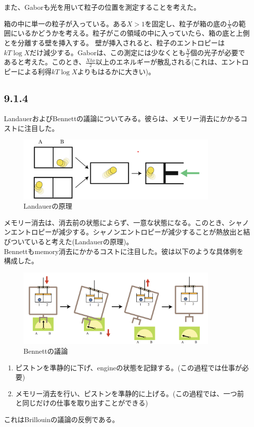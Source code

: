 \documentclass[a4paper,11pt]{jsarticle}
\numberwithin{equation}{section}
\begin{document}
また、Gaborも光を用いて粒子の位置を測定することを考えた。

箱の中に単一の粒子が入っている。ある$X>1$を固定し、粒子が箱の底の$\frac{1}{X}$の範囲にいるかどうかを考える。粒子がこの領域の中に入っていたら、箱の底と上側とを分離する壁を挿入する。
壁が挿入されると、粒子のエントロピーは$kT\log X$だけ減少する。Gaborは、この測定には少なくとも$\frac{X}{2}$個の光子が必要であると考えた。このとき、$\frac{Xh\nu}{2} $以上のエネルギーが散乱される(これは、エントロピーによる利得$kT\log X$よりもはるかに大きい)。\\

\subsection*{9.1.4}
LandauerおよびBennettの議論についてみる。彼らは、メモリー消去にかかるコストに注目した。\\

\begin{figure}
    \begin{center}
    \includegraphics[width=100mm]{Landauer.png}
    \end{center}
    \caption{Landauerの原理}
    \label{fig:Landauer}
\end{figure}

メモリー消去は、消去前の状態によらず、一意な状態になる。このとき、シャノンエントロピーが減少する。シャノンエントロピーが減少することが熱放出と結びついていると考えた(Landauerの原理)。\\

Bennettもmemory消去にかかるコストに注目した。彼は以下のような具体例を構成した。\\
\begin{figure}[H]
    \begin{center}
    \includegraphics[width=100mm]{Bennett.png}
    \end{center}
    \caption{Bennettの議論}
    \label{fig:Bennett}
\end{figure}
\begin{enumerate}
    \item ピストンを準静的に下げ、engineの状態を記録する。(この過程では仕事が必要)
    \item メモリー消去を行い、ピストンを準静的に上げる。(この過程では、一つ前と同じだけの仕事を取り出すことができる)
\end{enumerate}
これはBrillouinの議論の反例である。\\
\end{document}
